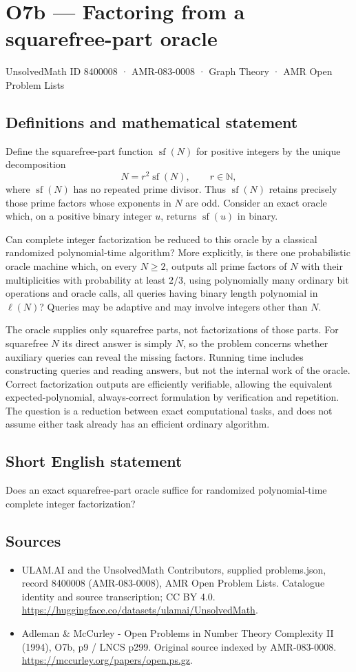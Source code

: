 \documentclass[11pt,a4paper]{article}
\begin{document}
\section*{O7b — Factoring from a squarefree-part oracle}\label{8400008}
{\small UnsolvedMath ID 8400008 · AMR-083-0008 · Graph Theory · AMR Open Problem Lists}
\subsection{Definitions and mathematical statement}
Define the squarefree-part function $\operatorname{sf}(N)$ for positive integers by the unique decomposition
\[
N=r^2\operatorname{sf}(N),\qquad r\in\mathbb N,
\]
where $\operatorname{sf}(N)$ has no repeated prime divisor. Thus $\operatorname{sf}(N)$ retains precisely those prime factors whose exponents in $N$ are odd. Consider an exact oracle which, on a positive binary integer $u$, returns $\operatorname{sf}(u)$ in binary.

Can complete integer factorization be reduced to this oracle by a classical randomized polynomial-time algorithm? More explicitly, is there one probabilistic oracle machine which, on every $N\ge2$, outputs all prime factors of $N$ with their multiplicities with probability at least $2/3$, using polynomially many ordinary bit operations and oracle calls, all queries having binary length polynomial in $\ell(N)$? Queries may be adaptive and may involve integers other than $N$.

The oracle supplies only squarefree parts, not factorizations of those parts. For squarefree $N$ its direct answer is simply $N$, so the problem concerns whether auxiliary queries can reveal the missing factors. Running time includes constructing queries and reading answers, but not the internal work of the oracle. Correct factorization outputs are efficiently verifiable, allowing the equivalent expected-polynomial, always-correct formulation by verification and repetition. The question is a reduction between exact computational tasks, and does not assume either task already has an efficient ordinary algorithm.
\subsection{Short English statement}
Does an exact squarefree-part oracle suffice for randomized polynomial-time complete integer factorization?
\subsection{Sources}
\begin{itemize}
\item[S1] ULAM.AI and the UnsolvedMath Contributors, supplied problems.json, record 8400008 (AMR-083-0008), AMR Open Problem Lists. Catalogue identity and source transcription; CC BY 4.0.
\url{https://huggingface.co/datasets/ulamai/UnsolvedMath}.
\item[S2] Adleman \& McCurley - Open Problems in Number Theory Complexity II (1994), O7b, p9 / LNCS p299. Original source indexed by AMR-083-0008.
\url{https://mccurley.org/papers/open.ps.gz}.
\end{itemize}
\end{document}
